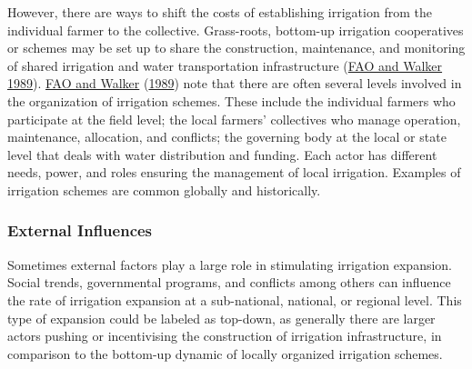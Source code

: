 \documentclass[12pt,twoside]{reedthesis}
\begin{document}
However, there are ways to shift the costs of establishing irrigation from the individual farmer to the collective. Grass-roots, bottom-up irrigation cooperatives or schemes may be set up to share the construction, maintenance, and monitoring of shared irrigation and water transportation infrastructure (\protect\hyperlink{ref-faoGuidelinesDesigningEvaluating1989}{FAO and Walker 1989}). \protect\hyperlink{ref-faoGuidelinesDesigningEvaluating1989}{FAO and Walker} (\protect\hyperlink{ref-faoGuidelinesDesigningEvaluating1989}{1989}) note that there are often several levels involved in the organization of irrigation schemes. These include the individual farmers who participate at the field level; the local farmers' collectives who manage operation, maintenance, allocation, and conflicts; the governing body at the local or state level that deals with water distribution and funding. Each actor has different needs, power, and roles ensuring the management of local irrigation. Examples of irrigation schemes are common globally and historically.

\hypertarget{extinf}{%
\subsubsection{External Influences}\label{extinf}}

Sometimes external factors play a large role in stimulating irrigation expansion. Social trends, governmental programs, and conflicts among others can influence the rate of irrigation expansion at a sub-national, national, or regional level. This type of expansion could be labeled as top-down, as generally there are larger actors pushing or incentivising the construction of irrigation infrastructure, in comparison to the bottom-up dynamic of locally organized irrigation schemes.
\end{document}

